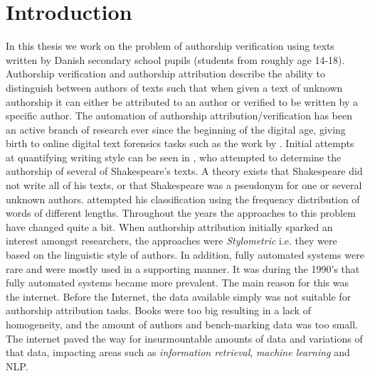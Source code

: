 %

\section{Introduction} \label{sec:introduction}


In this thesis we work on the problem of authorship verification using texts
written by Danish secondary school pupils (students from roughly age 14-18).
Authorship verification and authorship attribution describe the ability to
distinguish between authors of texts such that when given a text of unknown
authorship it can either be attributed to an author or verified to be written
by a specific author. The automation of authorship attribution/verification
has been an active branch of research ever since the beginning of the digital
age, giving birth to online digital text forensics tasks such as the work
by \citet{pan:2015}. Initial attempts at quantifying writing style can be
seen in \citet{Mendenhall237}, who attempted to determine the authorship of
several of Shakespeare's texts. A theory exists that Shakespeare did not write
all of his texts, or that Shakespeare was a pseudonym for one or several
unknown authors. \citet{Mendenhall237} attempted his classification using the
frequency distribution of words of different lengths. Throughout the years
the approaches to this problem have changed quite a bit. When authorship
attribution initially sparked an interest amongst researchers, the approaches
were \textit{Stylometric} i.e. they were based on the linguistic style of
authors. In addition, fully automated systems were rare and were mostly used
in a supporting manner. It was during the 1990's that fully automated systems
became more prevalent. The main reason for this was the internet. Before the
Internet, the data available simply was not suitable for authorship attribution
tasks. Books were too big resulting in a lack of homogeneity, and the amount
of authors and bench-marking data was too small. The internet paved the way
for insurmountable amounts of data and variations of that data, impacting
areas such as \textit{information retrieval}, \textit{machine learning} and
\gls{NLP}.\cite{stamatos2009}

